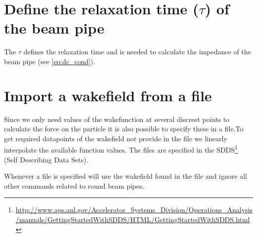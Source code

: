 \section{Define the relaxation time ($\tau$) of the beam pipe}
\label{sec:TAU}
The $\tau$ defines the relaxation time and is needed to calculate the impedance of the beam pipe (see \ref{eq:dc_cond}).

\section{Import a wakefield from a file}
\label{sec:WFNAME}

Since we only need values of the wakefunction at several discreet points to calculate the force on the particle it is also possible to specify these in a file.To get required datapoints of the wakefield not provide in the file we linearly interpolate the available function values. The files are specified in the SDDS\footnote{\url{http://www.aps.anl.gov/Accelerator_Systems_Division/Operations_Analysis/manuals/GettingStartedWithSDDS/HTML/GettingStartedWithSDDS.html}} (Self Describing Data Sets).

Whenever a file is specified \opal will use the wakefield found in the file and ignore all other commands related to round beam pipes.
